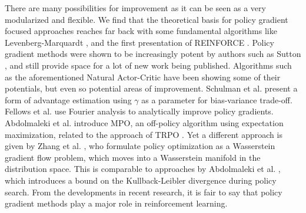 There are many possibilities for improvement as it can be seen as a very modularized and flexible. We find that the theoretical basis for policy gradient focused approaches reaches far back with some fundamental algorithms like Levenberg-Marquardt \cite{levenbergmarquardt1978}, and the first presentation of REINFORCE \cite{Williams92simplestatistical}. Policy gradient methods were shown to be increasingly potent by authors such as Sutton \cite{Sutton:1999:PGM:3009657.3009806}, and still provide space for a lot of new work being published. Algorithms such as the aforementioned Natural Actor-Critic \cite{4863} have been showing some of their potentials, but even so potential areas of improvement. Schulman et al. \cite{DBLP:journals/corr/SchulmanMLJA15} present a form of advantage estimation using $\gamma$ as a parameter for bias-variance trade-off. Fellows et al. \cite{fellows:icml18} use Fourier analysis to analytically improve policy gradients. Abdolmaleki et al. \cite{abdolmaleki2018maximum} introduce MPO, an off-policy algorithm using expectation maximization, related to the approach of TRPO \cite{pmlr-v37-schulman15}. Yet a different approach is given by Zhang et al. \cite{DBLP:journals/corr/abs-1808-03030}, who formulate policy optimization as a Wasserstein gradient flow problem, which moves into a Wasserstein manifold in the distribution space. This is comparable to approaches by Abdolmaleki et al. \cite{NIPS2015_5672}, which introduces a bound on the Kullback-Leibler divergence during policy search. From the developments in recent research, it is fair to say that policy gradient methods play a major role in reinforcement learning. 





